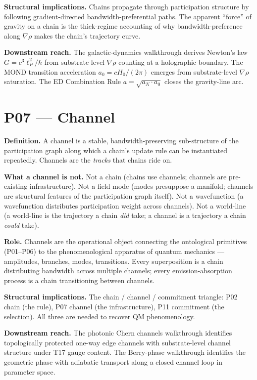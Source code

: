 \documentclass[11pt,a4paper]{article}
\begin{document}
\textbf{Structural implications.} Chains propagate through participation structure by following gradient-directed bandwidth-preferential paths. The apparent ``force'' of gravity on a chain is the thick-regime accounting of why bandwidth-preference along $\nabla\rho$ makes the chain's trajectory curve.

\textbf{Downstream reach.} The galactic-dynamics walkthrough derives Newton's law $G = c^{3}\ell_P^{2}/\hbar$ from substrate-level $\nabla\rho$ counting at a holographic boundary. The MOND transition acceleration $a_0 = c H_0/(2\pi)$ emerges from substrate-level $\nabla\rho$ saturation. The ED Combination Rule $a = \sqrt{a_N \cdot a_0}$ closes the gravity-line arc.

\section{P07 --- Channel}

\textbf{Definition.} A channel is a stable, bandwidth-preserving sub-structure of the participation graph along which a chain's update rule can be instantiated repeatedly. Channels are the \emph{tracks} that chains ride on.

\textbf{What a channel is not.} Not a chain (chains use channels; channels are pre-existing infrastructure). Not a field mode (modes presuppose a manifold; channels are structural features of the participation graph itself). Not a wavefunction (a wavefunction distributes participation weight across channels). Not a world-line (a world-line is the trajectory a chain \emph{did} take; a channel is a trajectory a chain \emph{could} take).

\textbf{Role.} Channels are the operational object connecting the ontological primitives (P01--P06) to the phenomenological apparatus of quantum mechanics --- amplitudes, branches, modes, transitions. Every superposition is a chain distributing bandwidth across multiple channels; every emission-absorption process is a chain transitioning between channels.

\textbf{Structural implications.} The chain / channel / commitment triangle: P02 chain (the rule), P07 channel (the infrastructure), P11 commitment (the selection). All three are needed to recover QM phenomenology.

\textbf{Downstream reach.} The photonic Chern channels walkthrough identifies topologically protected one-way edge channels with substrate-level channel structure under T17 gauge content. The Berry-phase walkthrough identifies the geometric phase with adiabatic transport along a closed channel loop in parameter space.
\end{document}
